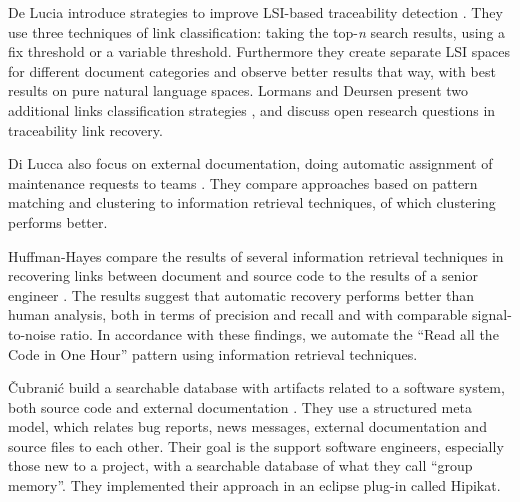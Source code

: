 De Lucia \etal introduce strategies to improve LSI-based traceability detection \cite{Luci04a}. They use three techniques of link classification: taking the top-\emph{n} search results, using a fix threshold or a variable threshold. Furthermore they create separate LSI spaces for different document categories and observe better results that way, with best results on pure natural language spaces. Lormans and Deursen present two additional links classification strategies \cite{Lorm06a}, and discuss open research questions in traceability link recovery.

Di Lucca \etal also focus on external documentation, doing automatic assignment of maintenance requests to teams \cite{Lucc02b}. They compare approaches based on pattern matching and clustering to information retrieval techniques, of which clustering performs better.

Huffman-Hayes \etal compare the results of several information retrieval techniques in recovering links between document and source code to the results of a senior engineer \cite{Huff06a}. The results suggest that automatic recovery performs better than human analysis, both in terms of precision and recall and with comparable signal-to-noise ratio. In accordance with these findings, we automate the ``Read all the Code in One Hour'' pattern using information retrieval techniques.

\v{C}ubrani\'{c} \etal build a searchable database with artifacts related to a software system, both source code and external documentation \cite{Cubr03a}. They use a structured meta model, which relates bug reports, news messages, external documentation and source files to each other. Their goal is the support software engineers, especially those new to a project, with a searchable database of what they call ``group memory''. They implemented their approach in an eclipse plug-in called Hipikat.


